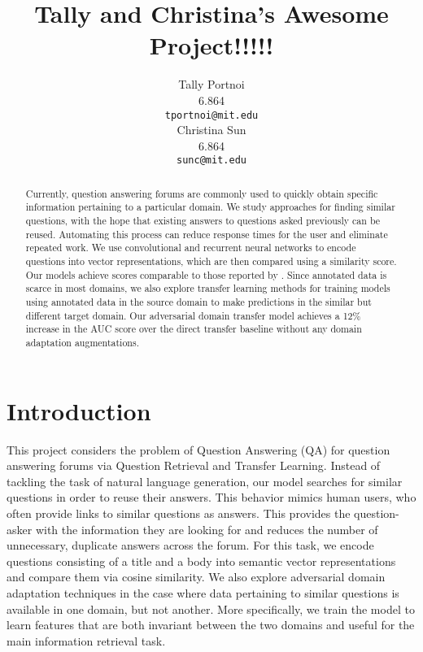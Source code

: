 \documentclass[11pt,a4paper]{article}
\title{Tally and Christina's Awesome Project!!!!!}
\author{Tally Portnoi \\
  6.864 \\
  {\tt tportnoi@mit.edu} \\\And
  Christina Sun \\
  6.864 \\
  {\tt sunc@mit.edu} \\}
\date{}
\begin{document}
\maketitle
\begin{abstract}
Currently, question answering forums are commonly used to quickly obtain specific information pertaining to a particular domain. We study approaches for finding similar questions, with the hope that existing answers to questions asked previously can be reused. Automating this process can reduce response times for the user and eliminate repeated work. We use convolutional and recurrent neural networks to encode questions into vector representations, which are then compared using a similarity score. Our models achieve scores comparable to those reported by \cite{lei}. Since annotated data is scarce in most domains, we also explore transfer learning methods for training models using annotated data in the source domain to make predictions in the similar but different target domain. Our adversarial domain transfer model achieves a 12\% increase in the AUC score over the direct transfer baseline without any domain adaptation augmentations.
\end{abstract}

\section{Introduction}
This project considers the problem of Question Answering (QA) for question answering forums via Question Retrieval and Transfer Learning. Instead of tackling the task of natural language generation, our model searches for similar questions in order to reuse their answers. This behavior mimics human users, who often provide links to similar questions as answers. This provides the question-asker with the information they are looking for and reduces the number of unnecessary, duplicate answers across the forum. For this task, we encode questions consisting of a title and a body into semantic vector representations and compare them via cosine similarity. We also explore adversarial domain adaptation techniques in the case where data pertaining to similar questions is available in one domain, but not another. More specifically, we train the model to learn features that are both invariant between the two domains and useful for the main information retrieval task.
\end{document}
